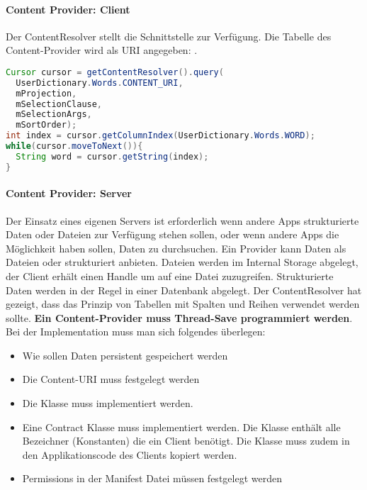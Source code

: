 \paragraph{Content Provider: Client} Der ContentResolver stellt die Schnittstelle zur Verfügung. Die Tabelle des Content-Provider wird als URI angegeben: .
\begin{lstlisting}[language=java]
Cursor cursor = getContentResolver().query(
  UserDictionary.Words.CONTENT_URI,
  mProjection,
  mSelectionClause,
  mSelectionArgs,
  mSortOrder);
int index = cursor.getColumnIndex(UserDictionary.Words.WORD);
while(cursor.moveToNext()){
  String word = cursor.getString(index);
}
\end{lstlisting}
\paragraph{Content Provider: Server} Der Einsatz eines eigenen Servers ist erforderlich wenn andere Apps strukturierte Daten oder Dateien zur Verfügung stehen sollen, oder wenn andere Apps die Möglichkeit haben sollen, Daten zu durchsuchen. Ein Provider kann Daten als Dateien oder strukturiert anbieten. Dateien werden im Internal Storage abgelegt, der Client erhält einen Handle um auf eine Datei zuzugreifen. Strukturierte Daten werden in der Regel in einer Datenbank abgelegt. Der ContentResolver hat gezeigt, dass das Prinzip von Tabellen mit Spalten und Reihen verwendet werden sollte. \textbf{Ein Content-Provider muss Thread-Save programmiert werden}.\\
Bei der Implementation muss man sich folgendes überlegen:
\begin{itemize}
\item Wie sollen Daten persistent gespeichert werden
\item Die Content-URI muss festgelegt werden
\item Die Klasse  muss implementiert werden.
\item Eine Contract Klasse muss implementiert werden. Die Klasse enthält alle Bezeichner (Konstanten) die ein Client benötigt. Die Klasse muss zudem in den Applikationscode des Clients kopiert werden.
\item Permissions in der Manifest Datei müssen festgelegt werden
\end{itemize}